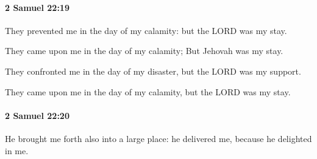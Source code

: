 		\paragraph{2 Samuel 22:19} %
			\label{2SAMUEL-22-19}

			They prevented me in the day of my calamity: but the LORD was my stay.

			\begin{versebox}
					\item[BHS] 
					\item[ASV] They came upon me in the day of my calamity; But Jehovah was my stay.
					\item[NIV] They confronted me in the day of my disaster, but the LORD was my support.
					\item[NRSV] They came upon me in the day of my calamity, but the LORD was my stay.
			\end{versebox}

		\paragraph{2 Samuel 22:20} %
			\label{2SAMUEL-22-20}

			He brought me forth also into a large place: he delivered me, because he delighted in me.

